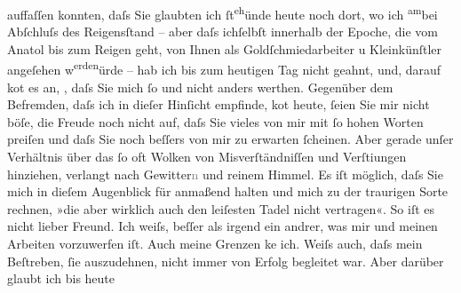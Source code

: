                auffaſſen konnten, daſs Sie glaubten ich{ }ſt\substVorne{}\textsuperscript{eh}\substDazwischen{}ünd\substHinten{}e heute noch dort, wo ich \substVorne{}\textsuperscript{am}\substDazwischen{}bei\substHinten{} Abſchluſs des Reigensſtand – aber \introOben{}daſs ich\introOben{}{ }ſelbſt innerhalb der Epoche, die vom Anatol bis zum Reigen
               geht, von Ihnen als Goldſchmiedarbeiter u Kleinkünſtler angeſehen w\substVorne{}\textsuperscript{erden}\substDazwischen{}ürde\substHinten{} – hab ich bis {\pb}zum heutigen Tag
               nicht geahnt, und, darauf ko{\geminationm}t es an, \label{T_L02988-5v}\label{T_L02988-5}, daſs Sie mich{ }ſo und nicht anders werthen. Gegenüber dem
               Befremden, daſs ich in dieſer Hinſicht empfinde, ko{\geminationm}t
               heute,{ }ſeien Sie mir nicht böſe, die Freude noch nicht {\pb}auf, daſs Sie vieles von mir mit{ }ſo hohen
               Worten preiſen und daſs Sie noch beſſers von mir zu erwarten{ }ſcheinen. Aber gerade
               unſer Verhältnis \introOben{}über\introOben{} das{ }ſo oft \strikeout{\textcolor{gray}{unter}} Wolken von Misverſtändniſſen und Verſti{\geminationm}ungen
               hinziehen, verlangt nach Gewitter\textcolor{gray}{n} und reinem Himmel. Es iſt
               möglich, daſs Sie mich in dieſem Augenblick für {\pb}anmaßend halten und mich zu der traurigen
               Sorte rechnen, »die aber wirklich auch den leiſesten Tadel nicht vertragen«. So iſt
               es nicht lieber Freund. Ich weiſs, beſſer als irgend ein andrer, was mir und meinen
               Arbeiten vorzuwerfen iſt. Auch meine Grenzen ke{\geminationn} ich.
               Weiſs auch, daſs mein Beſtreben,{ }ſie aus{\pb}zudehnen, nicht immer von Erfolg begleitet war. Aber darüber glaubt ich bis heute
